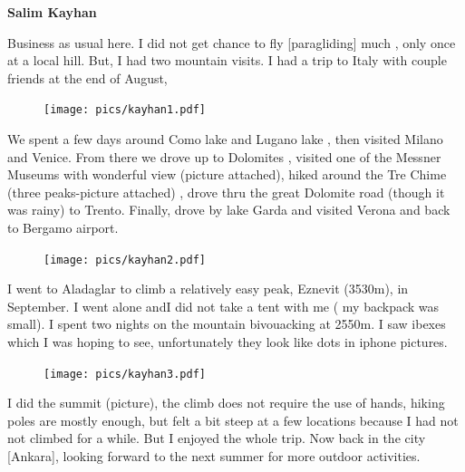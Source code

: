 \documentclass[10pt,a4paper]{article}
\begin{document}
\begin{multicols}{2}
\textbf{Salim Kayhan}




Business as usual here. I did not get chance to fly [paragliding] much , only once at a local hill.
But, I had two mountain visits. I had a trip to Italy with couple friends at the end of August,\begin{figure}
	\vspace{-20pt}
	\begin{center}
		\texttt{[image: pics/kayhan1.pdf]}
	\end{center}
	\vspace{-20pt}
\end{figure}
We spent a few days around Como lake and Lugano lake ,  then visited Milano and Venice.
From there we drove up to Dolomites , visited one of the Messner Museums with wonderful view (picture attached), hiked around the Tre Chime (three peaks-picture attached) , drove thru the great Dolomite road (though it was rainy) to Trento. Finally, drove by lake Garda and visited Verona and back to Bergamo airport. 
\begin{figure}
	\vspace{-20pt}
	\begin{center}
		\texttt{[image: pics/kayhan2.pdf]}
	\end{center}
	\vspace{-20pt}
\end{figure}


    I went to Aladaglar to climb a relatively easy peak, Eznevit (3530m), in September. I went alone andI did not take a tent with me ( my backpack was small). I spent two nights on the mountain bivouacking at 2550m.    I saw ibexes which I was hoping to see, unfortunately they look like dots in iphone pictures.
\begin{figure}
	\vspace{-20pt}
	\begin{center}
		\texttt{[image: pics/kayhan3.pdf]}
	\end{center}
	\vspace{-20pt}
\end{figure}
    
     I did the summit (picture), the climb does not require the use of hands, hiking poles are mostly enough, but felt a bit steep at a few locations because I had not not climbed for a while. But I enjoyed the whole trip.
Now back in the city [Ankara], looking forward to the next summer for more outdoor activities.










\end{multicols}
\end{document}
